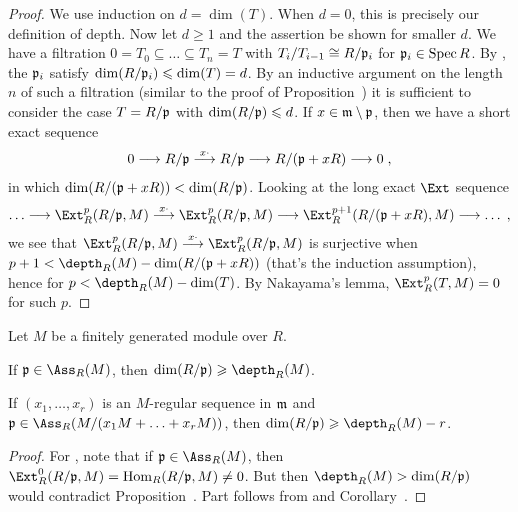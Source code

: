 \documentclass[a4paper,parskip=half,numbers=enddot, DIV=12]{scrreprt}
\renewcommand{\geq}{\geqslant}
\renewcommand{\leq}{\leqslant}
\begin{document}
\begin{proof}
	We use induction on $d=\dim(T)$. When $d=0$, this is precisely our definition of depth. Now let $d\geq 1$ and the assertion be shown for smaller $d$. We have a filtration $0=T_0\subseteq\ldots\subseteq T_n=T$ with $T_i/T_{i-1}\cong R/\mathfrak{p}_i$ for $\mathfrak{p}_i\in\operatorname{Spec} R$. By \cite[Fact~3.4.1]{alg2}, the $\mathfrak{p}_i$ satisfy $\dim(R/\pp_i)\leq \dim(T)=d$. By an inductive argument on the length $n$ of such a filtration (similar to the proof of Proposition~) it is sufficient to consider the case $T=R/\mathfrak{p}$ with $\dim(R/\pp)\leq d$. If $x\in\mathfrak{m}\setminus \mathfrak{p}$, then we have a short exact sequence 
	\begin{align*}
		0\morphism R/\pp\morphism[x\cdot ]R/\pp\morphism R/(\pp+xR)\morphism 0\;, 
	\end{align*}
	in which $\dim(R/(\mathfrak{p}+xR))<\dim(R/\mathfrak{p})$. Looking at the long exact $\Ext$ sequence
	\begin{align*}
		\ldots\morphism\Ext_R^p(R/\pp,M)\morphism[x\cdot]\Ext_R^p(R/\pp,M)\morphism\Ext_R^{p+1}(R/(\pp+xR),M)\morphism\ldots\;,
	\end{align*}
	we see that $\Ext_R^p(R/\pp,M)\morphism[x\cdot]\Ext_R^p(R/\pp,M)$ is surjective when $p+1<\depth_R(M)-\dim(R/(\pp+xR))$ (that's the induction assumption), hence for $p<\depth_R(M)-\dim(T)$. By Nakayama's lemma, $\Ext_R^p(T,M)=0$ for such $p$.
\end{proof}
\begin{cor}
	Let $M$ be a finitely generated module over $R$.
	\begin{alphanumerate}
		\item {}If $\pp\in\Ass_R(M)$, then $\dim(R/\pp)\geq\depth_R(M)$.
		\item If $(x_1,\ldots,x_r)$ is an $M$-regular sequence in $\mathfrak{m}$ and $\pp\in\Ass_R(M/(x_1M+\ldots+x_rM))$, then $\dim(R/\pp)\geq \depth_R(M)-r$.
	\end{alphanumerate}
\end{cor}
\begin{proof}
	For , note that if $\pp\in\Ass_R(M)$, then $\Ext_R^0(R/\pp,M)=\Hom_R(R/\pp,M)\neq 0$. But then $\depth_R(M)>\dim (R/\pp)$ would contradict Proposition~. Part  follows from  and Corollary~.
\end{proof}
\end{document}
